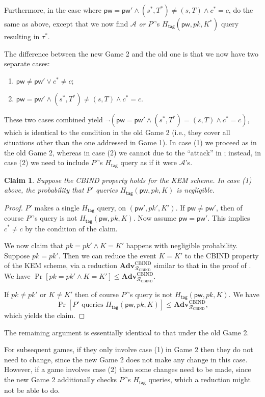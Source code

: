 \documentclass{article}
\theoremstyle{plain}
\newtheorem{claim}{Claim}
\theoremstyle{definition}
\theoremstyle{remark}
\newcommand{\adv}{\mathcal{A}}
\newcommand{\red}{\mathcal{R}}
\newcommand{\Adv}{\mathbf{Adv}}
\newcommand{\Htag}{H_\mathsf{tag}}
\newcommand{\pw}{\mathsf{pw}}
\begin{document}
Furthermore, in the case where $\pw = \pw' \land (s^*,T^*) \neq (s,T) \land c^* = c$, do the same as above, except that we now find $\adv$ {\color{blue}\emph{or $P'$}}'s $\Htag(\pw,pk,K^*)$ query resulting in $\tau^*$.

{\color{blue}The difference between the new Game 2 and the old one is that we now have two separate cases:
\begin{enumerate}
  \item $\pw \neq \pw' \lor c^* \neq c$;
  \item $\pw = \pw' \land (s^*,T^*) \neq (s,T) \land c^* = c$.
\end{enumerate}
}
These two cases combined yield $\neg(\pw = \pw' \land (s^*,T^*) = (s,T) \land c^* = c)$, which is identical to the condition in the old Game 2 (i.e., they cover all situations other than the one addressed in Game 1). In case (1) we proceed as in the old Game 2, whereas {\color{blue}in case (2) we cannot due to the ``attack'' in ; instead, in case (2) we need to include $P'$'s $\Htag$ query as if it were $\adv$'s}.
\begin{claim}
\label{clm:htag5}
Suppose the CBIND property holds for the KEM scheme. In case (1) above, the probability that $P'$ queries $\Htag(\pw,pk,K)$ is negligible.
\end{claim}
\begin{proof}
$P'$ makes a single $\Htag$ query, on $(\pw',pk',K')$. If $\pw \neq \pw'$, then of course $P'$'s query is not $\Htag(\pw,pk,K)$. Now assume $\pw = \pw'$. This implies $c^* \neq c$ by the condition of the claim.

We now claim that $pk = pk' \land K = K'$ happens with negligible probability. Suppose $pk = pk'$. Then we can reduce the event $K = K'$ to the CBIND property of the KEM scheme, via a reduction $\Adv_{\red_\text{CBIND}}^\text{CBIND}$ similar to that in the proof of . We have $\Pr[pk = pk' \land K = K'] \leq \Adv_{\red_\text{CBIND}}^\text{CBIND}$.

If $pk \neq pk'$ or $K \neq K'$ then of course $P'$'s query is not $\Htag(\pw,pk,K)$. We have
\[
\Pr[P'\text{ queries }\Htag(\pw,pk,K)] \leq \Adv_{\red_\text{CBIND}}^\text{CBIND},
\]
which yields the claim.
\end{proof}
The remaining argument is essentially identical to that under the old Game 2.

\medskip
For subsequent games, if they only involve case (1) in Game 2 then they do not need to change, since the new Game 2 does not make any change in this case. However, if a game involves case (2) then some changes need to be made, since the new Game 2 additionally checks $P'$'s $\Htag$ queries, which a reduction might not be able to do.
\end{document}
